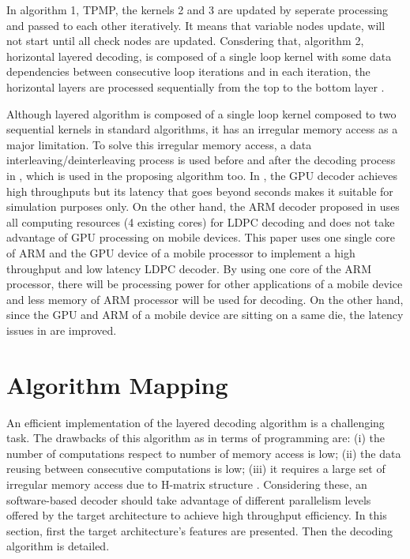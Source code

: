 \documentclass[conference]{IEEEtran}
\begin{document}
In algorithm 1, TPMP, the kernels 2 and 3 are updated by seperate processing and passed to each other iteratively. It means that variable nodes update, will not start until all check nodes are updated. Consdering that, algorithm 2, horizontal layered decoding, is composed of a single loop kernel with some data dependencies between consecutive loop iterations and in each iteration, the horizontal layers are processed sequentially from the top to the bottom layer \cite{art_quasi}.

Although layered algorithm is composed of a single loop kernel composed to two sequential kernels in standard algorithms, it has an irregular memory access as a major limitation. To solve this irregular memory access, a data interleaving/deinterleaving process is used before and after the decoding process in \cite{art_gpu_0, art_neon}, which is used in the proposing algorithm too. In \cite{art_gpu_0}, the GPU decoder achieves high throughputs but its latency that goes beyond seconds makes it suitable for simulation purposes only. On the other hand, the ARM decoder proposed in \cite{art_neon} uses all computing resources (4 existing cores) for LDPC decoding and does not take advantage of GPU processing on mobile devices. This paper uses one single core of ARM and the GPU device of a mobile processor to implement a high throughput and low latency LDPC decoder. By using one core of the ARM processor, there will be processing power for other applications of a mobile device and less memory of ARM processor will be used for decoding. On the other hand, since the GPU and ARM of a mobile device are sitting on a same die, the latency issues in \cite{art_gpu_0} are improved.

\section{Algorithm Mapping}\label{sec3}

An efficient implementation of the layered decoding algorithm is a challenging task. The drawbacks of this algorithm as in terms of programming are: (i) the number of computations respect to number of memory access is low; (ii) the data reusing between consecutive computations is low; (iii) it requires a large set of irregular memory access due to H-matrix structure \cite{art_ldpc_cpu1}. Considering these, an software-based decoder should take advantage of different parallelism levels offered by the target architecture to achieve high throughput efficiency. In this section, first the target architecture's features are presented. Then the decoding algorithm is detailed.
\end{document}
